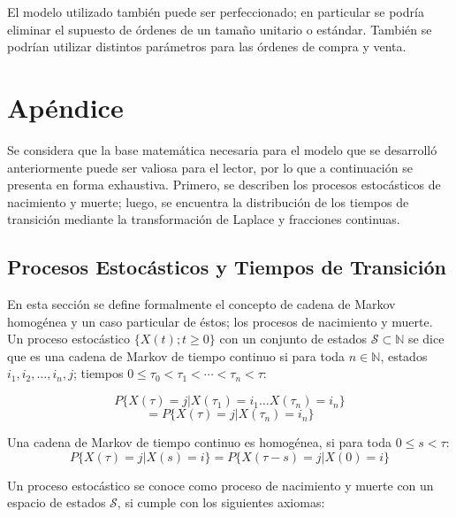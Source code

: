 \documentclass[11pt]{article}
\numberwithin{equation}{section} %
\begin{document}
El modelo utilizado también puede ser perfeccionado; en particular se podría eliminar el supuesto de órdenes de un tamaño unitario o estándar. También se podrían utilizar distintos parámetros para las órdenes de compra y venta.


\clearpage

\appendix
\section{Apéndice} \label{App:AppendixA}

Se considera que la base matemática necesaria para el modelo que se desarrolló anteriormente puede ser valiosa para el lector, por lo que a continuación se presenta en forma exhaustiva. Primero, se describen los procesos estocásticos de nacimiento y muerte; luego, se encuentra la distribución de los tiempos de transición mediante la transformación de Laplace y fracciones continuas.\\

\subsection{Procesos Estocásticos y Tiempos de Transición}

En esta sección se define formalmente el concepto de cadena de Markov homogénea y un caso particular de éstos; los procesos de nacimiento y muerte. Un proceso estocástico $\{X(t);t\geq 0\}$ con un conjunto de estados $\mathcal{S} \subset \mathbb{N}$ se dice que es una cadena de Markov de tiempo continuo si para toda $n \in \mathbb{N}$, estados $i_{1},i_{2},\ldots,i_{n},j$; tiempos $0\leq\tau_0<\tau_1<\cdots<\tau_n<\tau$:

\[
P\{X(\tau)=j|X(\tau_1)=i_1\ldots X(\tau_n)=i_n\}
\]
\begin{equation}
= P\{X(\tau)=j|X(\tau_n)=i_n\}
\end{equation}

Una cadena de Markov de tiempo continuo es homogénea, si para toda $0\leq s <\tau$:
\begin{equation}
P\{X(\tau)=j|X(s)=i\}=P\{X(\tau-s)=j|X(0)=i\}
\end{equation}

Un proceso estocástico se conoce como proceso de nacimiento y muerte con un espacio de estados $\mathcal{S}$, si cumple con los siguientes axiomas:
\end{document}
